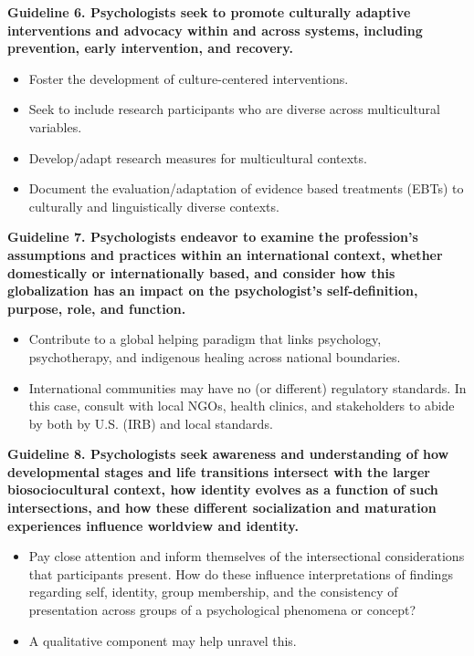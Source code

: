 \documentclass[
  english,
]{book}
\providecommand{\tightlist}{%
  \setlength{\itemsep}{0pt}\setlength{\parskip}{0pt}}
\begin{document}
\textbf{Guideline 6. Psychologists seek to promote culturally adaptive interventions and advocacy within and across systems, including prevention, early intervention, and recovery.}

\begin{itemize}
\tightlist
\item
  Foster the development of culture-centered interventions.
\item
  Seek to include research participants who are diverse across multicultural variables.
\item
  Develop/adapt research measures for multicultural contexts.
\item
  Document the evaluation/adaptation of evidence based treatments (EBTs) to culturally and linguistically diverse contexts.
\end{itemize}

\textbf{Guideline 7. Psychologists endeavor to examine the profession's assumptions and practices within an international context, whether domestically or internationally based, and consider how this globalization has an impact on the psychologist's self-definition, purpose, role, and function.}

\begin{itemize}
\tightlist
\item
  Contribute to a global helping paradigm that links psychology, psychotherapy, and indigenous healing across national boundaries.
\item
  International communities may have no (or different) regulatory standards. In this case, consult with local NGOs, health clinics, and stakeholders to abide by both by U.S. (IRB) and local standards.
\end{itemize}

\textbf{Guideline 8. Psychologists seek awareness and understanding of how developmental stages and life transitions intersect with the larger biosociocultural context, how identity evolves as a function of such intersections, and how these different socialization and maturation experiences influence worldview and identity.}

\begin{itemize}
\tightlist
\item
  Pay close attention and inform themselves of the intersectional considerations that participants present. How do these influence interpretations of findings regarding self, identity, group membership, and the consistency of presentation across groups of a psychological phenomena or concept?
\item
  A qualitative component may help unravel this.
\end{itemize}
\end{document}
